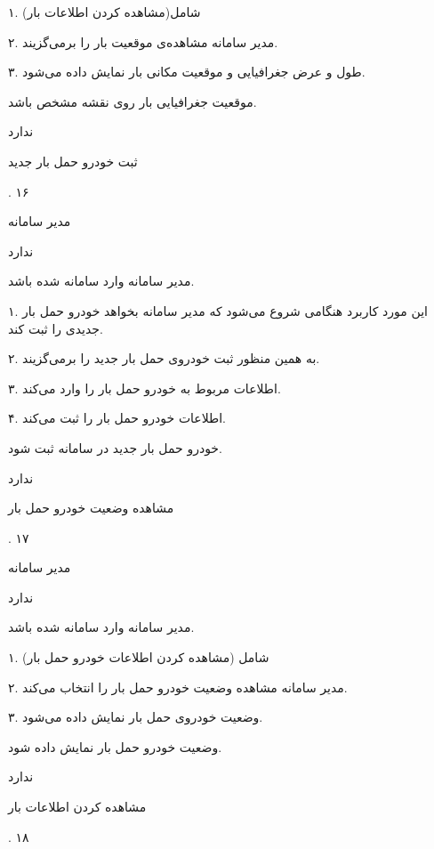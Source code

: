 ۱. شامل(مشاهده کردن اطلاعات بار)

۲. مدیر سامانه مشاهده‌ی موقعیت بار را برمی‌گزیند.

۳. طول و عرض جغرافیایی و موقعیت مکانی بار نمایش داده می‌شود.

موقعیت جغرافیایی بار روی نقشه مشخص باشد.

ندارد

\noindent \hrulefill

ثبت خودرو حمل بار جدید

.
۱۶

مدیر سامانه

ندارد

مدیر سامانه وارد سامانه شده باشد.


۱. این مورد کاربرد هنگامی شروع می‌شود که مدیر سامانه بخواهد خودرو حمل بار جدیدی را ثبت کند.

۲. به همین منظور ثبت خودروی حمل بار جدید را برمی‌گزیند.

۳. اطلاعات مربوط به خودرو حمل بار را وارد می‌کند.

۴. اطلاعات خودرو حمل بار را ثبت می‌کند.

خودرو حمل بار جدید در سامانه ثبت شود.

ندارد

\noindent \hrulefill

مشاهده وضعیت خودرو حمل بار

.
۱۷

مدیر سامانه

ندارد

مدیر سامانه وارد سامانه شده باشد.


۱. شامل (مشاهده کردن اطلاعات خودرو حمل بار)

۲. مدیر سامانه مشاهده وضعیت خودرو حمل بار را انتخاب می‌کند.

۳. وضعیت خودروی حمل بار نمایش داده می‌شود.

وضعیت خودرو حمل بار نمایش داده شود.

ندارد

\noindent \hrulefill

مشاهده کردن اطلاعات بار

.
۱۸


